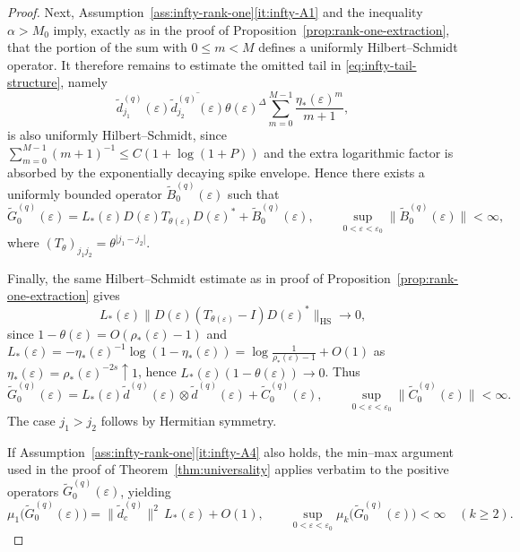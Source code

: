 \documentclass[11pt]{amsart}
\numberwithin{equation}{section}
\theoremstyle{plain}
\theoremstyle{definition}
\theoremstyle{remark}
\begin{document}
\begin{proof}
Next, Assumption~\ref{ass:infty-rank-one}\textup{\ref{it:infty-A1}} and the
inequality \(\alpha>M_0\) imply, exactly as in the proof of
Proposition~\ref{prop:rank-one-extraction}, that the portion of the sum with
\(0\le m<M\) defines a uniformly Hilbert--Schmidt operator. It therefore
remains to estimate the omitted tail in \eqref{eq:infty-tail-structure},
namely
\[
\widetilde d^{(q)}_{j_1}(\varepsilon)
\overline{\widetilde d^{(q)}_{j_2}(\varepsilon)}
\theta(\varepsilon)^\Delta
\sum_{m=0}^{M-1}\frac{\eta_*(\varepsilon)^m}{m+1},
\]
is also uniformly Hilbert--Schmidt, since
\(\sum_{m=0}^{M-1}(m+1)^{-1}\le C(1+\log(1+P))\) and the extra logarithmic
factor is absorbed by the exponentially decaying spike envelope. Hence there
exists a uniformly bounded operator \(\widetilde B^{(q)}_0(\varepsilon)\) such
that
\[
\widetilde G^{(q)}_0(\varepsilon)
=
L_*(\varepsilon)
D(\varepsilon)T_{\theta(\varepsilon)}D(\varepsilon)^*
+
\widetilde B^{(q)}_0(\varepsilon),
\qquad
\sup_{0<\varepsilon<\varepsilon_0}
\|\widetilde B^{(q)}_0(\varepsilon)\|<\infty,
\]
where \((T_\theta)_{j_1j_2}=\theta^{|j_1-j_2|}\).

Finally, the same Hilbert--Schmidt estimate as in proof of
Proposition~\ref{prop:rank-one-extraction} gives
\[
L_*(\varepsilon)
\bigl\|D(\varepsilon)(T_{\theta(\varepsilon)}-I)D(\varepsilon)^*\bigr\|_{\mathrm{HS}}
\longrightarrow 0,
\]
since \(1-\theta(\varepsilon)=O(\rho_*(\varepsilon)-1)\) and
\(L_*(\varepsilon)=-\eta_*(\varepsilon)^{-1}\log(1-\eta_*(\varepsilon))
=\log\!\frac{1}{\rho_*(\varepsilon)-1}+O(1)\) as
\(\eta_*(\varepsilon)=\rho_*(\varepsilon)^{-2s}\uparrow1\), hence
\(L_*(\varepsilon)(1-\theta(\varepsilon))\to0\). Thus
\[
\widetilde G^{(q)}_0(\varepsilon)
=
L_*(\varepsilon)
\widetilde d^{(q)}(\varepsilon)\otimes
\widetilde d^{(q)}(\varepsilon)
+
\widetilde C^{(q)}_0(\varepsilon),
\qquad
\sup_{0<\varepsilon<\varepsilon_0}
\|\widetilde C^{(q)}_0(\varepsilon)\|<\infty.
\]
The case \(j_1>j_2\) follows by Hermitian symmetry.

If Assumption~\ref{ass:infty-rank-one}\textup{\ref{it:infty-A4}} also holds,
the min--max argument used in the proof of
Theorem~\ref{thm:universality} applies verbatim to the positive operators
\(\widetilde G^{(q)}_0(\varepsilon)\), yielding
\[
\mu_1\bigl(\widetilde G^{(q)}_0(\varepsilon)\bigr)
=
\|\widetilde d_c^{(q)}\|^2\,L_*(\varepsilon)+O(1),
\qquad
\sup_{0<\varepsilon<\varepsilon_0}
\mu_k\bigl(\widetilde G^{(q)}_0(\varepsilon)\bigr)<\infty
\quad (k\ge2).
\]
\end{proof}
\end{document}

